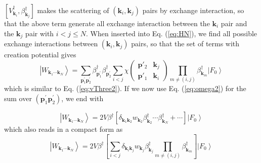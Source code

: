 \documentclass[aps,prb,superscriptaddress,showpacs,reprint,lengthcheck]{revtex4-1}
\newcommand{\vk}{\ensuremath{\mathbf{k}}}
\newcommand{\vp}{\ensuremath{\mathbf{p}}}
\begin{document}
 $\left[V^{\dagger}_{\mathbf{k} _{i}},\beta^{\dagger}_{\mathbf{k} _j}\right]$ makes the scattering of $(\mathbf{k} _{i},\mathbf{k} _{j})$ pairs by exchange interaction, so that the above term generate all exchange interaction between the $\mathbf{k} _{i}$ pair and the $\mathbf{k} _{j}$ pair with $i<j\leq{N}$.  When inserted into Eq. (\ref{eq:HN}), we find all possible exchange interactions between $(\mathbf{k} _{i},\mathbf{k} _{j})$ pairs, so that the set of terms with creation potential gives
\begin{equation}  
\left|W_{\mathbf{k} _1\cdots\mathbf{k} _N}\right>=\sum_{\vp^{\prime}_1\mathbf{p} ^{\prime}_2}\beta^{\dagger}_{\mathbf{p}
^{\prime}_1}\beta^{\dagger}_{\mathbf{p} ^{\prime}_2} \sum_{i<j}\chi\left(\begin{smallmatrix}\vp'_2&\vk_j\\\vp'_1&\vk_i%
\end{smallmatrix}\right)  \prod_{m\neq(i,j)}\beta^{\dagger}_{\mathbf{k} _m} \left|F_0\right>  
\end{equation}
 which is similar to Eq. (\ref{eq:vThree2}).  If we now use Eq. (\ref{eq:omega2}) for the sum over $(\vp^{\prime}_1\mathbf{p} ^{\prime}_2)$, we end with 
 
  \begin{equation}  
\left|W_{\mathbf{k} _1\cdots\mathbf{k} _N}\right>=2V\beta^\dagger[ \delta_{\vk_1\vk_2}w_{\vk_2}\beta^{\dagger}_{\mathbf{k} _2}\cdots\beta^{\dagger}_{\mathbf{k} _N}+\cdots ]\left|F_0\right>  
\end{equation}
which also reads in a compact form as 
 \begin{equation}  
\left|W_{\mathbf{k} _1\cdots\mathbf{k} _N}\right>=2V\beta^\dagger\left[ \sum_{i<j}\delta_{\vk_i\vk_j}w_{\vk_j}\beta^\dagger_{\vk_j}\prod_{m\neq(i,j)}\beta^{\dagger}_{\mathbf{k} _m} \right]\left|F_0\right>  
\end{equation}
\end{document}
